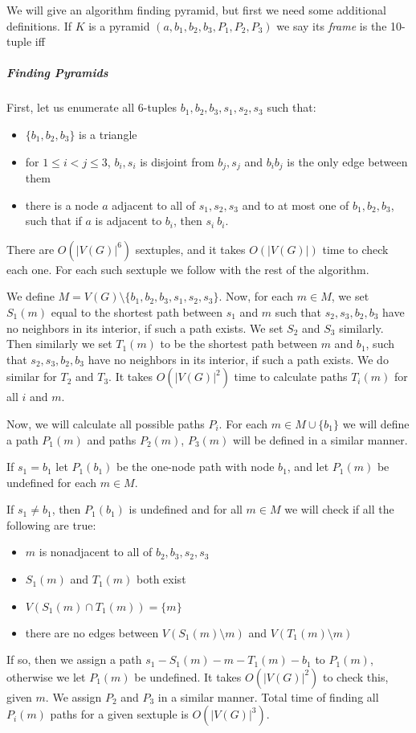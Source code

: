 \documentclass{article}
\newcommand{\TODO}{\todo[inline]}
\begin{document}
We will give an algorithm finding pyramid, but first we need some additional definitions. If $K$ is a pyramid $(a, b_1, b_2, b_3, P_1, P_2, P_3)$ we say its \emph{frame} is the 10-tuple iff
\TODO{finish it up}

\subparagraph{Finding Pyramids}

First, let us enumerate all 6-tuples $b_1, b_2, b_3, s_1, s_2, s_3$ such that:
\begin{itemize}
	\item $\{b_1, b_2, b_3\}$ is a triangle
	\item for $1 \leq i < j \leq 3$, ${b_i, s_i}$ is disjoint from ${b_j, s_j}$ and $b_ib_j$ is the only edge between them
	\item there is a node $a$ adjacent to all of $s_1, s_2, s_3$ and to at most one of $b_1, b_2, b_3$, such that if $a$ is adjacent to $b_i$, then $s_i \ b_i$.
\end{itemize}

There are $O(|V(G)|^6)$ sextuples, and it takes $O(|V(G)|)$ time to check each one. For each such sextuple we follow with the rest of the algorithm. 

We define $M = V(G) \setminus \{b_1, b_2, b_3, s_1, s_2, s_3\}$. Now, for each $m \in M$, we set $S_1(m)$ equal to the shortest path between $s_1$ and $m$ such that $s_2, s_3, b_2, b_3$ have no neighbors in its interior, if such a path exists. We set $S_2$ and $S_3$ similarly. Then similarly we set $T_1(m)$ to be the shortest path between $m$ and $b_1$, such that $s_2, s_3, b_2, b_3$ have no neighbors in its interior, if such a path exists. We do similar for $T_2$ and $T_3$. It takes $O(|V(G)|^2)$ time to calculate paths $T_i(m)$ for all $i$ and $m$.

Now, we will calculate all possible paths $P_i$. For each $m \in M \cup \{b_1\}$ we will define a path $P_1(m)$ and paths $P_2(m)$, $P_3(m)$ will be defined in a similar manner.

If $s_1 = b_1$ let $P_1(b_1)$ be the one-node path with node $b_1$, and let $P_1(m)$ be undefined for each $m \in M$.

If $s_1 \neq b_1$, then $P_1(b_1)$ is undefined and for all $m \in M$ we will check if all the following are true:
\begin{itemize}
	\item $m$ is nonadjacent to all of $b_2, b_3, s_2, s_3$
	\item $S_1(m)$ and $T_1(m)$ both exist
	\item $V(S_1(m) \cap T_1(m)) = \{m\}$
	\item there are no edges between $V(S_1(m) \setminus m)$ and $V(T_1(m) \setminus m)$
\end{itemize}
If so, then we assign a path $s_1-S_1(m)-m-T_1(m)-b_1$ to $P_1(m)$, otherwise we let $P_1(m)$ be undefined. It takes $O(|V(G)|^2)$ to check this, given $m$. We assign $P_2$ and $P_3$ in a similar manner. Total time of finding all $P_i(m)$ paths for a given sextuple is $O(|V(G)|^3)$.
\end{document}
